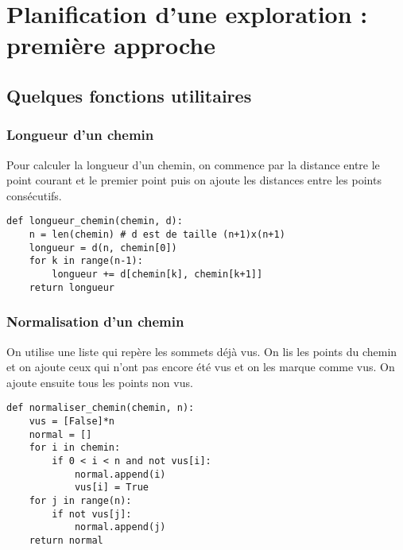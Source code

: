 \section{Planification d'une exploration : première approche}
\subsection{Quelques fonctions utilitaires}
\subsubsection{Longueur d'un chemin}
\begin{Exercise}[title = {\bf I.C.5)}]
Pour calculer la longueur d'un chemin, on commence par la distance entre le point courant et le premier point puis on ajoute les distances entre les points consécutifs.
\begin{lstlisting}
def longueur_chemin(chemin, d):
    n = len(chemin) # d est de taille (n+1)x(n+1)
    longueur = d(n, chemin[0])
    for k in range(n-1):
        longueur += d[chemin[k], chemin[k+1]]
    return longueur
\end{lstlisting}
\end{Exercise}
\newpage
\subsubsection{Normalisation d'un chemin}
\begin{Exercise}[title = {\bf I.C.5)}]
On utilise une liste qui repère les sommets déjà vus. On lis les points du chemin et on ajoute ceux qui n'ont pas encore été vus et on les marque comme vus. On ajoute ensuite tous les points non vus.
\begin{lstlisting}
def normaliser_chemin(chemin, n):
    vus = [False]*n 
    normal = []
    for i in chemin:
        if 0 < i < n and not vus[i]:
            normal.append(i)
            vus[i] = True
    for j in range(n):
        if not vus[j]:
            normal.append(j)
    return normal
\end{lstlisting}
\end{Exercise}
